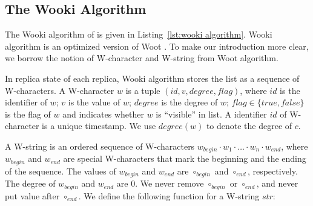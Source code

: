 \subsection{The Wooki Algorithm}
\label{subsec:the Wooki algorithm}

The Wooki algorithm of \cite{DBLP:conf/wise/WeissUM07} is given in Listing~\ref{lst:wooki algorithm}. %
Wooki algorithm is an optimized version of Woot \cite{DBLP:conf/cscw/OsterUMI06}. To make our introduction more clear, we borrow the notion of W-character and W-string from Woot algorithm.

In replica state of each replica, Wooki algorithm stores the list as a sequence of W-characters. A W-character $w$ is a tuple $(id,v,degree,flag)$, where $id$ is the identifier of $w$; $v$ is the value of $w$; $degree$ is the degree of $w$; $flag \in \{ \mathit{true},\mathit{false} \}$ is the flag of $w$ and indicates whether $w$ is ``visible'' in list. A identifier $id$ of W-character is a unique timestamp. %
We use $degree(w)$ to denote the degree of $c$.

A W-string is an ordered sequence of W-characters $w_{begin} \cdot w_1 \cdot \ldots \cdot w_n \cdot w_{end}$, where $w_{begin}$ and $w_{end}$ are special W-characters that mark the beginning and the ending of the sequence. The values of $w_{begin}$ and $w_{end}$ are $\circ_{begin}$ and $\circ_{end}$, respectively. The degree of $w_{begin}$ and $w_{end}$ are $0$. We never remove $\circ_{begin}$ or $\circ_{end}$, and never put value after $\circ_{end}$. We define the following function for a W-string $str$:

